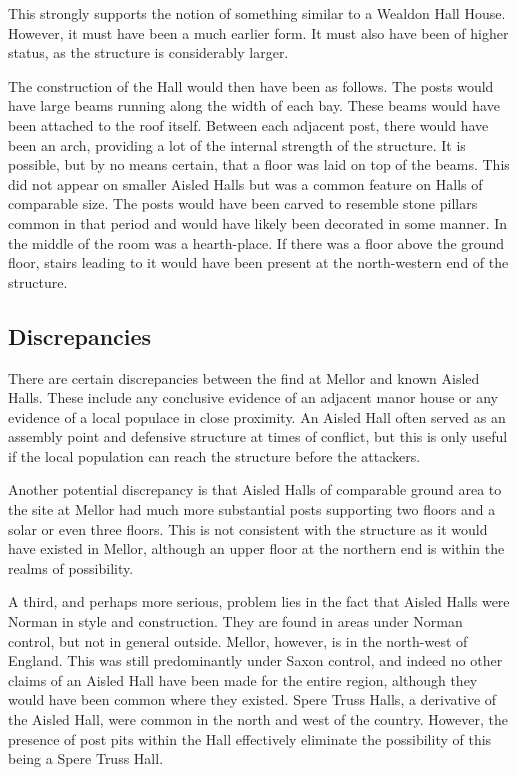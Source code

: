 \documentclass[letterpaper,11pt,titlepage]{article}
\begin{document}
{This strongly supports the notion of something similar to a Wealdon Hall House. However, it must have been a much earlier form. It must also have been of higher status, as the structure is considerably larger.

The construction of the Hall would then have been as follows. The posts would have large beams running along the width of each bay. These beams would have been attached to the roof itself. Between each adjacent post, there would have been an arch, providing a lot of the internal strength of the structure. It is possible, but by no means certain, that a floor was laid on top of the beams. This did not appear on smaller Aisled Halls but was a common feature on Halls of comparable size. The posts would have been carved to resemble stone pillars common in that period and would have likely been decorated in some manner. In the middle of the room was a hearth-place. If there was a floor above the ground floor, stairs leading to it would have been present at the north-western end of the structure. 

\subsection{Discrepancies}
There are certain discrepancies between the find at Mellor and known Aisled Halls. These include any conclusive evidence of an adjacent manor house or any evidence of a local populace in close proximity. An Aisled Hall often served as an assembly point and defensive structure at times of conflict, but this is only useful if the local population can reach the structure before the attackers. 

Another potential discrepancy is that Aisled Halls of comparable ground area to the site at Mellor had much more substantial posts supporting two floors and a solar or even three floors. This is not consistent with the structure as it would have existed in Mellor, although an upper floor at the northern end is within the realms of possibility.

A third, and perhaps more serious, problem lies in the fact that Aisled Halls were Norman in style and construction. They are found in areas under Norman control, but not in general outside. Mellor, however, is in the north-west of England. This was still predominantly under Saxon control, and indeed no other claims of an Aisled Hall have been made for the entire region, although they would have been common where they existed. Spere Truss Halls, a derivative of the Aisled Hall, were common in the north and west of the country. However, the presence of post pits within the Hall effectively eliminate the possibility of this being a Spere Truss Hall.

}
\end{document}
